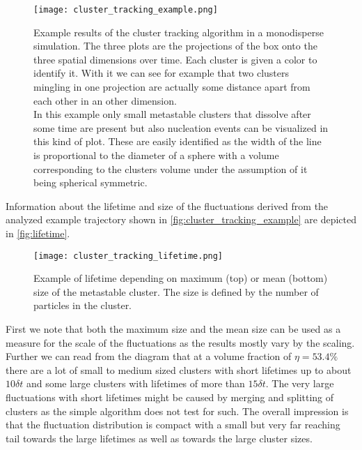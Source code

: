 \begin{figure}[h]
\centering
\texttt{[image: cluster\_tracking\_example.png]}
\caption[Individual cluster tracking example]{Example results of the cluster tracking algorithm in a monodisperse simulation. The three plots are the projections of the box onto the three spatial dimensions over time. Each cluster is given a color to identify it. With it we can see for example that two clusters mingling in one projection are actually some distance apart from each other in an other dimension.\\
In this example only small metastable clusters that dissolve after some time are present but also nucleation events can be visualized in this kind of plot. These are easily identified as the width of the line is proportional to the diameter of a sphere with a volume corresponding to the clusters volume under the assumption of it being spherical symmetric.}
\label{fig:cluster_tracking_example}
\end{figure}
Information about the lifetime and size of the fluctuations derived from the analyzed example trajectory shown in \autoref{fig:cluster_tracking_example} are depicted in \autoref{fig:lifetime}.\\
\begin{figure}[h]
\centering
\texttt{[image: cluster\_tracking\_lifetime.png]}
\caption[Example for correlation between a unstable cluster's size and lifetime]{Example of lifetime depending on  maximum (top) or mean (bottom) size of the metastable cluster. The size is defined by the number of particles in the cluster.}
\label{fig:lifetime}
\end{figure}
First we note that both the maximum size and the mean size can be used as a measure for the scale of the fluctuations as the results mostly vary by the scaling. Further we can read from the diagram that at a volume fraction of $\eta = 53.4\%$ there are a lot of small to medium sized clusters with short lifetimes up to about $10 \delta t$ and some large clusters with lifetimes of more than $15 \delta t$. The very large fluctuations with short lifetimes might be caused by merging and splitting of clusters as the simple algorithm does not test for such. The overall impression is that the fluctuation distribution is compact with a small but very far reaching tail towards the large lifetimes as well as towards the large cluster sizes.
\FloatBarrier




